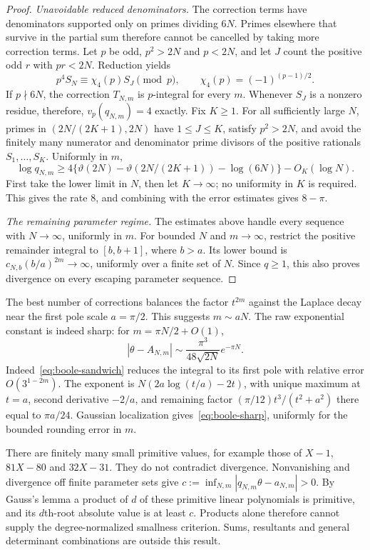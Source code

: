 \begin{proof}
\emph{Unavoidable reduced denominators.}
The correction terms have denominators supported only on primes
dividing $6N$. Primes elsewhere that survive in the partial sum
therefore cannot be cancelled by taking more correction terms.
Let $p$ be odd, $p^2>2N$ and $p<2N$, and let
$J$ count the positive odd $r$ with $pr<2N$. Reduction yields
\begin{equation}\label{eq:boole-residue}
 p^4S_N\equiv\chi_4(p)S_J\pmod p,\qquad
 \chi_4(p)=(-1)^{(p-1)/2}.
\end{equation}
If $p\nmid6N$, the correction $T_{N,m}$ is $p$-integral for every
$m$. Whenever $S_J$ is a nonzero residue, therefore,
$v_p(q_{N,m})=4$ exactly. Fix $K\geq1$. For all sufficiently large
$N$, primes in $(2N/(2K+1),2N)$ have $1\leq J\leq K$, satisfy
$p^2>2N$, and avoid the finitely many numerator and denominator prime
divisors of the positive rationals $S_1,\ldots,S_K$. Uniformly in $m$,
\[
 \log q_{N,m}\geq4\{\vartheta(2N)-\vartheta(2N/(2K+1))
                           -\log(6N)\}-O_K(\log N).
\]
First take the lower limit in $N$, then let $K\to\infty$; no uniformity
in $K$ is required. This gives the rate $8$, and combining with the
error estimates gives $8-\pi$.

\emph{The remaining parameter regime.}
The estimates above handle every sequence with $N\to\infty$,
uniformly in $m$. For bounded $N$ and $m\to\infty$, restrict the positive remainder
integral to $[b,b+1]$, where $b>a$. Its lower bound is
$c_{N,b}(b/a)^{2m}\to\infty$, uniformly over a finite set of $N$.
Since $q\geq1$, this also proves divergence on every escaping
parameter sequence.
\end{proof}

The best number of corrections balances the factor $t^{2m}$ against
the Laplace decay near the first pole scale $a=\pi/2$. This suggests
$m\sim aN$. The raw exponential constant is indeed sharp: for
$m=\pi N/2+O(1)$,
\begin{equation}\label{eq:boole-sharp}
 |\theta-A_{N,m}|\sim
       \frac{\pi^3}{48\sqrt{2N}}e^{-\pi N}.
\end{equation}
Indeed~\eqref{eq:boole-sandwich} reduces the integral to its first
pole with relative error $O(3^{1-2m})$. The exponent is
$N(2a\log(t/a)-2t)$, with unique maximum at $t=a$, second derivative
$-2/a$, and remaining factor $(\pi/12)t^3/(t^2+a^2)$ there equal
to $\pi a/24$. Gaussian localization gives~\eqref{eq:boole-sharp},
uniformly for the bounded rounding error in $m$.

There are finitely many small primitive values, for example those of
$X-1$, $81X-80$ and $32X-31$. They do not contradict divergence.
Nonvanishing and divergence off finite parameter sets give
$c:=\inf_{N,m}|q_{N,m}\theta-a_{N,m}|>0$. By Gauss's lemma a product
of $d$ of these primitive linear polynomials is primitive, and its
$d$th-root absolute value is at least $c$. Products alone therefore
cannot supply the degree-normalized smallness criterion. Sums,
resultants and general determinant combinations are outside this result.
